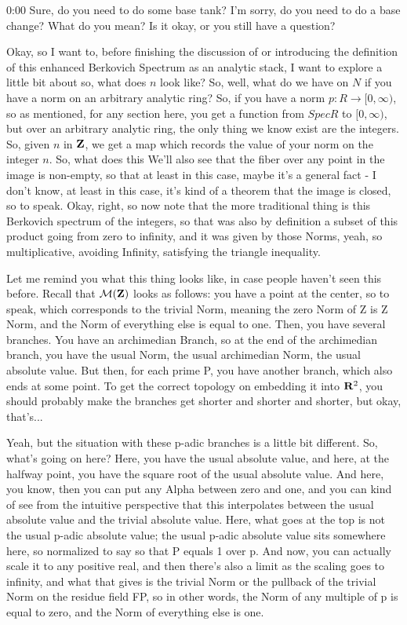 \begin{unfinished}{0:00}
Sure, do you need to do some base tank? I'm sorry, do you need to do a base change? What do you mean? Is it okay, or you still have a question?

Okay, so I want to, before finishing the discussion of or introducing the definition of this enhanced Berkovich Spectrum as an analytic stack, I want to explore a little bit about so, what does $n$ look like? So, well, what do we have on $N$ if you have a norm on an arbitrary analytic ring? So, if you have a norm $p: R \to [0, \infty)$, so as mentioned, for any section here, you get a function from $Spec R$ to $[0, \infty)$, but over an arbitrary analytic ring, the only thing we know exist are the integers. So, given $n$ in $\mathbf Z$, we get a map which records the value of your norm on the integer $n$. So, what does this
We'll also see that the fiber over any point in the image is non-empty, so that at least in this case, maybe it's a general fact - I don't know, at least in this case, it's kind of a theorem that the image is closed, so to speak. Okay, right, so now note that the more traditional thing is this Berkovich spectrum of the integers, so that was also by definition a subset of this product going from zero to infinity, and it was given by those Norms, yeah, so multiplicative, avoiding Infinity, satisfying the triangle inequality.

Let me remind you what this thing looks like, in case people haven't seen this before. Recall that $\mathcal M(\mathbf Z)$ looks as follows: you have a point at the center, so to speak, which corresponds to the trivial Norm, meaning the zero Norm of Z is Z Norm, and the Norm of everything else is equal to one. Then, you have several branches. You have an archimedian Branch, so at the end of the archimedian branch, you have the usual Norm, the usual archimedian Norm, the usual absolute value. But then, for each prime P, you have another branch, which also ends at some point. To get the correct topology on embedding it into $\mathbf R^2$, you should probably make the branches get shorter and shorter and shorter, but okay, that's...

Yeah, but the situation with these p-adic branches is a little bit different. So, what's going on here? Here, you have the usual absolute value, and here, at the halfway point, you have the square root of the usual absolute value. And here, you know, then you can put any Alpha between zero and one, and you can kind of see from the intuitive perspective that this interpolates between the usual absolute value and the trivial absolute value. Here, what goes at the top is not the usual p-adic absolute value; the usual p-adic absolute value sits somewhere here, so normalized to say so that P equals 1 over p. And now, you can actually scale it to any positive real, and then there's also a limit as the scaling goes to infinity, and what that gives is the trivial Norm or the pullback of the trivial Norm on the residue field FP, so in other words, the Norm of any multiple of p is equal to zero, and the Norm of everything else is one.


\end{unfinished}
